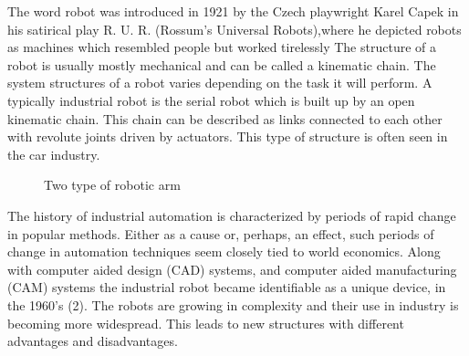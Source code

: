 The word robot was introduced in 1921 by the Czech playwright Karel Capek in his satirical play R. U. R. (Rossum’s Universal Robots),where he depicted robots as machines which resembled people but worked tirelessly The structure of a robot is usually mostly mechanical and can be called a kinematic chain. The system structures of a robot varies depending on the task it will perform. A typically industrial robot is the serial robot which is built up by an open kinematic chain. This chain can be described as links connected to each other with revolute joints driven by actuators. This type of structure is often seen in the car industry.
\begin{figure}[H]
    \centering
    \qquad
    \caption{Two type of robotic arm}%
    \label{fig:type_of_robotic_arm}%
\end{figure}
The history of industrial automation is characterized by periods of rapid change in popular methods. Either as a cause or, perhaps, an effect, such periods of change in automation techniques seem closely tied to world economics. Along with computer aided design (CAD) systems, and computer aided manufacturing (CAM) systems the industrial robot became identifiable as a unique device, in the 1960’s (2). The robots are growing in complexity and their use in industry is becoming more widespread. This leads to new structures with different advantages and disadvantages\cite{intro_robotic_thesis}.

